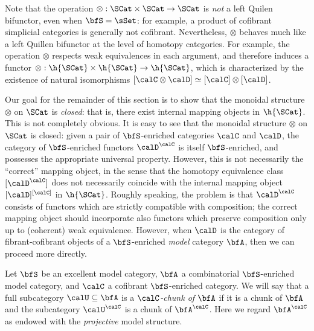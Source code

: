 \begin{Simplicial Categories}
Note that the operation $\otimes: \SCat \times \SCat \rightarrow \SCat$ is {\em not}
a left Quilen bifunctor, even when $\bfS = \sSet$: for example, a product of cofibrant
simplicial categories is generally not cofibrant. Nevertheless, $\otimes$ behaves
much like a left Quillen bifunctor at the level of homotopy categories. 
For example, the operation $\otimes$ respects weak equivalences in each argument, and therefore
induces a functor $\otimes: \h{ \SCat} \times \h{\SCat} \rightarrow \h{\SCat}$, which is
characterized by the existence of natural isomorphisms
$[ \calC \otimes \calD] \simeq [\calC] \otimes [\calD]$.

Our goal for the remainder of this section is to show that the monoidal structure
$\otimes$ on $\SCat$ is {\em closed}: that is, there exist internal mapping objects in
$\h{\SCat}$. This is not completely obvious. It is easy to see that the monoidal structure
$\otimes$ on $\SCat$ is closed: given a pair of $\bfS$-enriched categories $\calC$ and
$\calD$, the category of $\bfS$-enriched functors $\calD^{\calC}$ is itself $\bfS$-enriched,
and possesses the appropriate universal property. However, this is not necessarily
the ``correct'' mapping object, in the sense that the homotopy equivalence class
$[ \calD^{\calC} ]$ does not necessarily coincide with the internal mapping object
$[\calD]^{[ \calC] }$ in $\h{\SCat}$. Roughly speaking, the problem is that
$\calD^{\calC}$ consists of functors which are strictly compatible with composition; 
the correct mapping object should incorporate also functors which preserve composition only
up to (coherent) weak equivalence. However, when $\calD$ is the category of fibrant-cofibrant
objects of a $\bfS$-enriched {\em model} category $\bfA$, then we can proceed more directly.

\begin{definition}\label{cattusi}
Let $\bfS$ be an excellent model category, $\bfA$ a combinatorial $\bfS$-enriched model category,
and $\calC$ a cofibrant $\bfS$-enriched category. We will say that a full subcategory
$\calU \subseteq \bfA$ is a {\it $\calC$-chunk of $\bfA$} if it is a chunk of
$\bfA$ and the subcategory $\calU^{\calC}$ is a chunk of $\bfA^{\calC}$. 
Here we regard $\bfA^{\calC}$ as endowed with the {\em projective}
model structure.
\end{definition}



\end{Simplicial Categories}
